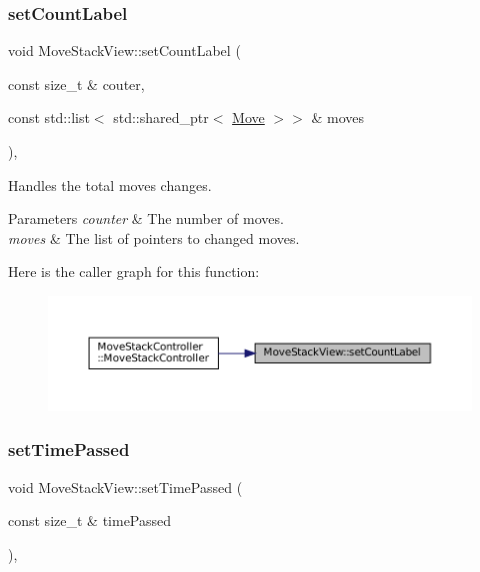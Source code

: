 \subsubsection{\texorpdfstring{setCountLabel}{setCountLabel}}
{\footnotesize\ttfamily void Move\+Stack\+View\+::set\+Count\+Label (\begin{DoxyParamCaption}\item[{const size\+\_\+t \&}]{couter,  }\item[{const std\+::list$<$ std\+::shared\+\_\+ptr$<$ \mbox{\hyperlink{struct_move}{Move}} $>$$>$ \&}]{moves }\end{DoxyParamCaption})\hspace{0.3cm}{\ttfamily [inline]}, {\ttfamily [slot]}}



Handles the total moves changes. 


\begin{DoxyParams}{Parameters}
{\em counter} & The number of moves. \\
\hline
{\em moves} & The list of pointers to changed moves. \\
\hline
\end{DoxyParams}
Here is the caller graph for this function\+:
\nopagebreak
\begin{figure}[H]
\begin{center}
\leavevmode
\includegraphics[width=350pt]{class_move_stack_view_ad3439eab1b100699aa82ece0b21de8a8_icgraph}
\end{center}
\end{figure}
\mbox{\label{class_move_stack_view_a6a70962da0c881426a408bb78cf9f974}} 
\subsubsection{\texorpdfstring{setTimePassed}{setTimePassed}}
{\footnotesize\ttfamily void Move\+Stack\+View\+::set\+Time\+Passed (\begin{DoxyParamCaption}\item[{const size\+\_\+t \&}]{time\+Passed }\end{DoxyParamCaption})\hspace{0.3cm}{\ttfamily [inline]}, {\ttfamily [slot]}}



